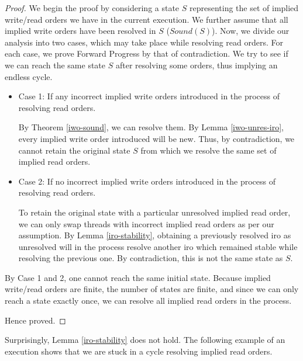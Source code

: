         \begin{proof}

            We begin the proof by considering a state $S$ representing the set of implied write/read orders we have in the current execution. 
            We further assume that all implied write orders have been resolved in $S$ ($Sound(S)$). 
            Now, we divide our analysis into two cases, which may take place while resolving read orders.
            For each case, we prove Forward Progress by that of contradiction.
            We try to see if we can reach the same state $S$ after resolving some orders, thus implying an endless cycle. 
            \begin{itemize}
                \item Case 1: If any incorrect implied write orders introduced in the process of resolving read orders. 

                    By Theorem \ref{iwo-sound}, we can resolve them. 
                    By Lemma \ref{iwo-unres-iro}, every implied write order introduced will be new.
                    Thus, by contradiction, we cannot retain the original state $S$ from which we resolve the same set of implied read orders. 

                \item Case 2: If no incorrect implied write orders introduced in the process of resolving read orders.

                    To retain the original state with a particular unresolved implied read order, we can only swap threads with incorrect implied read orders as per our assumption. 
                    By Lemma \ref{iro-stability}, obtaining a previously resolved iro as unresolved will in the process resolve another iro which remained stable while resolving the previous one.
                    By contradiction, this is not the same state as $S$. 
            \end{itemize}

            By Case 1 and 2, one cannot reach the same initial state.
            Because implied write/read orders are finite, the number of states are finite, and since we can only reach a state exactly once, 
            we can resolve all implied read orders in the process. 

            Hence proved.

        \end{proof}

        Surprisingly, Lemma \ref{iro-stability} does not hold. 
        The following example of an execution shows that we are stuck in a cycle resolving implied read orders.



